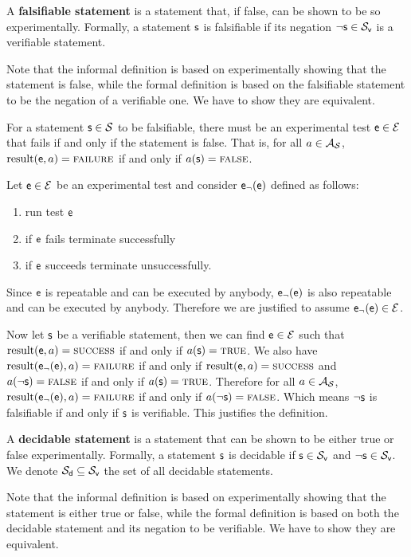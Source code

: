 	\begin{mathSection}
		\begin{defn}
			A \textbf{falsifiable statement} is a statement that, if false, can be shown to be so experimentally. Formally, a statement $\mathsf{s}$ is falsifiable if its negation $\neg\mathsf{s} \in \mathcal{S}_\textsf{v}$ is a verifiable statement.
		\end{defn}
		\begin{justification}
			Note that the informal definition is based on experimentally showing that the statement is false, while the formal definition is based on the falsifiable statement to be the negation of a verifiable one. We have to show they are equivalent.
			
			For a statement $\mathsf{s} \in \mathcal{S}$ to be falsifiable, there must be an experimental test $\mathsf{e} \in \mathcal{E}$ that fails if and only if the statement is false. That is, for all $a \in \mathcal{A}_{\mathcal{S}}$, $\operatorname{result}(\mathsf{e}, a) = \textsc{failure}$ if and only if $a(\mathsf{s}) = \textup{\textsc{false}}$.
			
			Let $\mathsf{e} \in \mathcal{E}$ be an experimental test and consider $\mathsf{e}_\neg(\mathsf{e})$ defined as follows:
			\begin{enumerate}
				\item run test $\mathsf{e}$
				\item if $\mathsf{e}$ fails terminate successfully
				\item if $\mathsf{e}$ succeeds terminate unsuccessfully.
			\end{enumerate}
			Since $\mathsf{e}$ is repeatable and can be executed by anybody, $\mathsf{e}_\neg(\mathsf{e})$ is also repeatable and can be executed by anybody. Therefore we are justified to assume $\mathsf{e}_\neg(\mathsf{e}) \in \mathcal{E}$.
			
			Now let $\mathsf{s}$ be a verifiable statement, then we can find $\mathsf{e} \in \mathcal{E}$ such that $\operatorname{result}(\mathsf{e}, a) = \textsc{success}$ if and only if $a(\mathsf{s}) = \textup{\textsc{true}}$. We also have $\operatorname{result}(\mathsf{e}_\neg(\mathsf{e}), a) = \textsc{failure}$ if and only if $\operatorname{result}(\mathsf{e}, a) = \textsc{success}$ and $a(\neg\mathsf{s}) = \textup{\textsc{false}}$ if and only if $a(\mathsf{s}) = \textup{\textsc{true}}$. Therefore for all $a \in \mathcal{A}_{\mathcal{S}}$, $\operatorname{result}(\mathsf{e}_\neg(\mathsf{e}), a) = \textsc{failure}$ if and only if $a(\neg\mathsf{s}) = \textup{\textsc{false}}$. Which means $\neg\mathsf{s}$ is falsifiable if and only if $\mathsf{s}$ is verifiable. This justifies the definition.
		\end{justification}
		\begin{defn}
			A \textbf{decidable statement} is a statement that can be shown to be either true or false experimentally. Formally, a statement $\mathsf{s}$ is decidable if $\mathsf{s} \in \mathcal{S}_\textsf{v}$ and $\neg\mathsf{s} \in \mathcal{S}_\textsf{v}$. We denote $\mathcal{S}_\textsf{d} \subseteq \mathcal{S}_\textsf{v}$ the set of all decidable statements.
		\end{defn}
		\begin{justification}
			Note that the informal definition is based on experimentally showing that the statement is either true or false, while the formal definition is based on both the decidable statement and its negation to be verifiable. We have to show they are equivalent.
			

\end{justification}
\end{mathSection}
